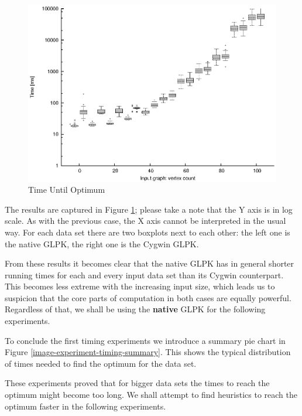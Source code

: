\begin{figure}
  \caption{Time Until Optimum}
  \label{image-experiment-time-until-optimum}
  \centering
    \includegraphics[width=\textwidth]{images/experiments/time-till-optimum}
\end{figure}

The results are captured in Figure \ref{image-experiment-time-until-optimum}; please take a note that the Y axis is in log scale. As with the previous case, the X axis cannot be interpreted in the usual way. For each data set there are two boxplots next to each other: the left one is the native GLPK, the right one is the Cygwin GLPK.

From these results it becomes clear that the native GLPK has in general shorter running times for each and every input data set than its Cygwin counterpart. This becomes less extreme with the increasing input size, which leads us to suspicion that the core parts of computation in both cases are equally powerful. Regardless of that, we shall be using the \textbf{native} GLPK for the following experiments.

To conclude the first timing experiments we introduce a summary pie chart in Figure \ref{image-experiment-timing-summary}. This shows the typical distribution of times needed to find the optimum for the  data set.

These experiments proved that for bigger data sets the times to reach the optimum might become too long. We shall attempt to find heuristics to reach the optimum faster in the following experiments.

